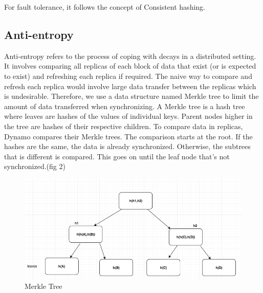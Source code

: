 \documentclass[twoside]{article}
\begin{document}
For fault tolerance, it follows the concept of Consistent hashing.

\subsection{Anti-entropy}
Anti-entropy refers to the process of coping with decays in a distributed setting. It involves comparing all replicas of each block of data that exist (or is expected to exist) and refreshing each replica if required. The naive way to compare and refresh each replica would involve large data transfer between the replicas which is undesirable. Therefore, we use a data structure named Merkle tree to limit the amount of data transferred when synchronizing. A Merkle tree is a hash tree where leaves are hashes of the values of individual keys. Parent nodes higher in the tree are hashes of their respective children. To compare data in replicas, Dynamo compares their Merkle trees. The comparison starts at the root. If the hashes are the same, the data is already synchronized. Otherwise, the subtrees that is different is compared. This goes on until the leaf node that's not synchronized.(fig 2)

\begin{figure}[h]
\centering
\includegraphics[width=0.5\linewidth]{fig2}
\caption[]{Merkle Tree}
\label{cpl}
\end{figure}\\
\end{document}
